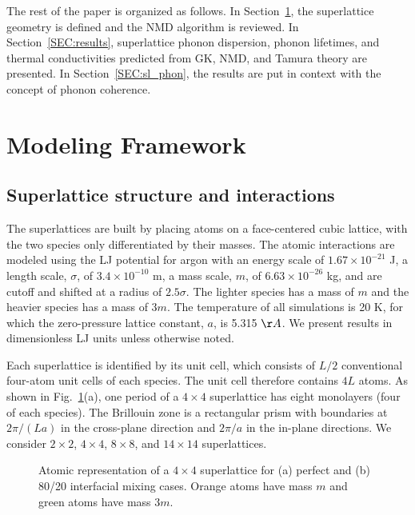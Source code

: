 \documentclass[aps,prb,preprint,preprintnumbers,amsmath,amssymb,floatfix,superscriptaddress]{revtex4}
\begin{document}
The rest of the paper is organized as follows. In Section~\ref{SEC:modeling}, the superlattice geometry is defined and the NMD algorithm is reviewed. In Section~\ref{SEC:results}, superlattice phonon dispersion, phonon lifetimes, and thermal conductivities predicted from GK, NMD, and Tamura theory are presented. In Section~\ref{SEC:sl_phon}, the results are put in context with the concept of phonon coherence.

\section{Modeling Framework}\label{SEC:modeling}
\subsection{Superlattice structure and interactions}\label{SEC:sl_struc}
The superlattices are built by placing atoms on a face-centered cubic lattice, with the two species only differentiated by their masses. The atomic interactions are modeled using the LJ potential for argon with an energy scale of $1.67\times10^{-21}$ J, a length scale, $\sigma$, of $3.4\times10^{-10}$ m, a mass scale, $m$, of $6.63\times10^{-26}$ kg, and are cutoff and shifted at a radius of $2.5\sigma$. The lighter species has a mass of $m$ and the heavier species has a mass of $3m$. The temperature of all simulations is 20 K, for which the zero-pressure lattice constant, $a$, is 5.315 $\AA$.\cite{mcgaugheythesis} We present results in  dimensionless LJ units unless otherwise noted. 

Each superlattice is identified by its unit cell, which consists of $L/2$ conventional four-atom unit cells of each species. The unit cell therefore contains $4L$ atoms. As shown in Fig.~\ref{fig:md_domain}(a), one period of a $4\times4$ superlattice has eight monolayers (four of each species). The Brillouin zone is a rectangular prism with boundaries at $2\pi/(La)$ in the cross-plane direction and $2\pi/a$ in the in-plane directions. We consider $2\times2$, $4\times4$, $8\times8$, and $14\times14$ superlattices.
\begin{figure}[t!]
\begin{center}
\renewcommand{\figure}{Fig.}
\caption{Atomic representation of a $4\times4$ superlattice for (a) perfect and (b) 80/20 interfacial mixing cases. Orange atoms have mass  $m$ and green atoms have mass $3m$.}
\label{fig:md_domain}
\end{center}
\end{figure}
\end{document}
